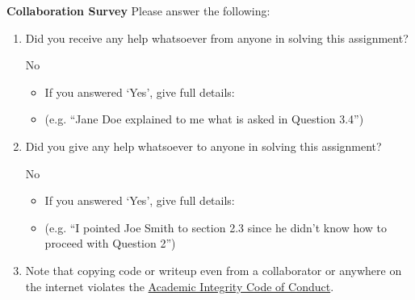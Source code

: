\documentclass[11pt,addpoints,answers]{exam}
\numberwithin{equation}{section} %
\numberwithin{figure}{section} %
\numberwithin{table}{section} %
\begin{document}
\clearpage

\clearpage

\textbf{Collaboration Survey} Please answer the following:

\begin{enumerate}
    \item Did you receive any help whatsoever from anyone in solving this assignment?
    \begin{checkboxes}
     \choice No
    \end{checkboxes}
    \begin{itemize}
        \item If you answered `Yes', give full details:
        \item (e.g. “Jane Doe explained to me what is asked in Question 3.4”)
    \end{itemize}

    \begin{tcolorbox}[fit,height=3cm,blank, borderline={1pt}{-2pt},nobeforeafter]
    \end{tcolorbox}

    \item Did you give any help whatsoever to anyone in solving this assignment?
    \begin{checkboxes}
     \choice No\
    \end{checkboxes}
    \begin{itemize}
        \item If you answered `Yes', give full details:
        \item (e.g. “I pointed Joe Smith to section 2.3 since he didn’t know how to proceed with Question 2”)
    \end{itemize}

    \begin{tcolorbox}[fit,height=3cm,blank, borderline={1pt}{-2pt},nobeforeafter]
    \end{tcolorbox}

    \item Note that copying code or writeup even from a collaborator or anywhere on the internet violates the \href{hhttps://www.cmu.edu/policies/student-and-student-life/academic-integrity.html}{Academic Integrity Code of Conduct}.
\end{enumerate}
\end{document}
